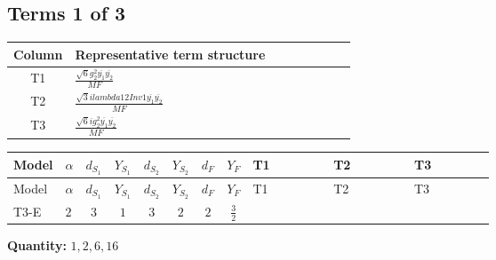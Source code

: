 \documentclass[8pt]{article}
\begin{document}
\begin{landscape}
\subsection*{Terms 1 of 3}
\begin{center}
\begin{tabular}{@{}c >{\raggedright\arraybackslash}p{0.82\linewidth}@{}}
\toprule
Column & Representative term structure \\
\midrule
T1 & \(\displaystyle \frac{\sqrt{6} g_{2}^{2} \overline{y_{1}} \overline{y_{2}}}{MF}\) \\
\midrule
T2 & \(\displaystyle \frac{\sqrt{3} i lambda12Inv1 \overline{y_{1}} \overline{y_{2}}}{MF}\) \\
\midrule
T3 & \(\displaystyle \frac{\sqrt{6} i g_{2}^{2} \overline{y_{1}} \overline{y_{2}}}{MF}\) \\
\midrule
\bottomrule
\end{tabular}
\end{center}
\smallskip
\tiny
\begin{longtable}{@{}llcccccc >{\raggedright\arraybackslash}p{0.21\linewidth} >{\raggedright\arraybackslash}p{0.21\linewidth} >{\raggedright\arraybackslash}p{0.21\linewidth}@{}}
\toprule
Model & $\alpha$ & $d_{S_1}$ & $Y_{S_1}$ & $d_{S_2}$ & $Y_{S_2}$ & $d_F$ & $Y_F$ & T1 & T2 & T3 \\
\midrule
\endfirsthead
\toprule
Model & $\alpha$ & $d_{S_1}$ & $Y_{S_1}$ & $d_{S_2}$ & $Y_{S_2}$ & $d_F$ & $Y_F$ & T1 & T2 & T3 \\
\midrule
\endhead
T3-E & $2$ & $3$ & $1$ & $3$ & $2$ & $2$ & $\frac{3}{2}$ & \scriptsize\adjustbox{max width=\linewidth}{$\begin{gathered} - \frac{\sqrt{6} g_{2}^{2} \overline{y_{1}} \overline{y_{2}}}{6 MF}\end{gathered}$} & \scriptsize\adjustbox{max width=\linewidth}{$\begin{gathered} - \frac{\sqrt{3} i lambda12Inv1 \overline{y_{1}} \overline{y_{2}}}{6 MF}\end{gathered}$} & \scriptsize\adjustbox{max width=\linewidth}{$\begin{gathered} \frac{\sqrt{6} i g_{2}^{2} \overline{y_{1}} \overline{y_{2}}}{6 MF}\end{gathered}$} \\
\midrule
\bottomrule
\end{longtable}
\clearpage
\noindent\textbf{Quantity: }$\mathrm{1,2,6,16}$\par\smallskip

\end{landscape}
\end{document}
